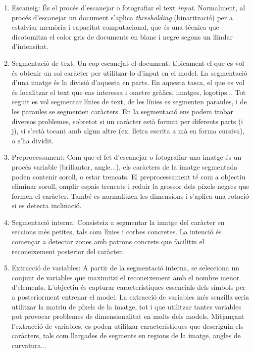 \documentclass[12pt, spanish]{article}
\begin{document}
\begin{enumerate}
\item Escaneig: És el procés d'escanejar o fotografiar el text \textit{input}. Normalment, al procés d'escanejar un document s'aplica \textit{thresholding} (binarització) per a estalviar memòria i capacitat computacional, que és una tècnica que dicotomitza el color gris de documents en blanc i negre segons un llindar d'intensitat.

\item Segmentació de text: Un cop escanejat el document, típicament el que es vol és obtenir un sol caràcter per utilitzar-lo d'input en el model. La segmentació d'una imatge és la divisió d'aquesta en parts. En aquesta tasca, el que es vol és localitzar el text que ens interessa i ometre gràfics, imatges, logotips... Tot seguit es vol segmentar línies de text, de les línies es segmenten paraules, i de les paraules se segmenten caràcters. En la segmentació ens podem trobar diversos problemes, sobretot si un caràcter està format per diferents parts (i j), si s'està tocant amb algun altre (ex. lletra escrita a mà en forma cursiva), o s'ha dividit.

\item Preprocessament: Com que el fet d'escanejar o fotografiar una imatge és un procés variable (brillantor, angle...), els caràcters de la imatge segmentada poden contenir soroll, o estar trencats. El preprocessament té com a objectiu eliminar soroll, omplir espais trencats i reduir la grossor dels píxels negres que formen el caràcter. També es normalitzen les dimensions i s'aplica una rotació si es detecta inclinació.

\item Segmentació interna: Consisteix a segmentar la imatge del caràcter en seccions més petites, tals com línies i corbes concretes. La intenció és començar a detectar zones amb patrons concrets que facilitin el reconeixement posterior del caràcter.

\item Extracció de variables: A partir de la segmentació interna, se selecciona un conjunt de variables que maximitzi el reconeixement amb el nombre menor d'elements. L'objectiu és capturar característiques essencials dels símbols per a posteriorment entrenar el model. La extracció de variables més senzilla seria utilitzar la matriu de píxels de la imatge, tot i que utilitzar tantes variables pot provocar problemes de dimensionalitat en molts dels models. Mitjançant l'extracció de variables, es poden utilitzar característiques que descriguin els caràcters, tals com llargades de segments en regions de la imatge, angles de curvatura...


\end{enumerate}
\end{document}
